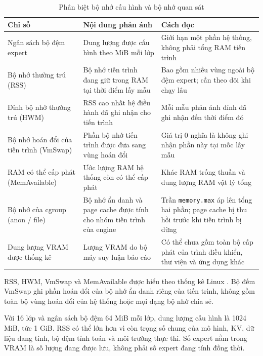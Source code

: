 \begin{table}[htbp]
\centering
\caption{Phân biệt bộ nhớ cấu hình và bộ nhớ quan sát}
\small
\setlength{\tabcolsep}{3pt}
\begin{tabularx}{\textwidth}{>{\RaggedRight\arraybackslash}p{3.5cm} >{\RaggedRight\arraybackslash}p{4cm} >{\RaggedRight\arraybackslash}X}
\toprule
\textbf{Chỉ số} & \textbf{Nội dung phản ánh} & \textbf{Cách đọc} \\
\midrule
Ngân sách bộ đệm expert & Dung lượng được cấu hình theo MiB mỗi lớp & Giới hạn một phần hệ thống, không phải tổng RAM tiến trình \\
Bộ nhớ thường trú (RSS) & Bộ nhớ tiến trình đang giữ trong RAM tại thời điểm lấy mẫu & Bao gồm nhiều vùng ngoài bộ đệm expert; cần theo dõi khi chạy lâu \\
Đỉnh bộ nhớ thường trú (HWM) & RSS cao nhất hệ điều hành đã ghi nhận cho tiến trình & Mỗi mẫu phản ánh đỉnh đã ghi nhận đến thời điểm đó \\
Bộ nhớ hoán đổi của tiến trình (VmSwap) & Phần bộ nhớ tiến trình được đưa sang vùng hoán đổi & Giá trị 0 nghĩa là không ghi nhận phần này tại mốc lấy mẫu \\
RAM có thể cấp phát (MemAvailable) & Ước lượng RAM hệ thống còn có thể cấp phát & Khác RAM trống thuần và dung lượng RAM vật lý tổng \\
Bộ nhớ của cgroup (anon / file) & Bộ nhớ ẩn danh và page cache được tính cho nhóm tiến trình của engine & Trần \texttt{memory.max} áp lên tổng hai phần; page cache bị thu hồi trước khi tiến trình bị dừng \\
Dung lượng VRAM được thống kê & Lượng VRAM do bộ máy suy luận báo cáo & Có thể chưa gồm toàn bộ cấp phát của trình điều khiển, thư viện và ứng dụng khác \\
\bottomrule
\end{tabularx}


\end{table}



RSS, HWM, VmSwap và MemAvailable được hiểu theo thống kê Linux \cite{linux_proc}. Bộ đếm VmSwap ghi phần hoán đổi của bộ nhớ ẩn danh riêng của tiến trình, không gồm toàn bộ vùng hoán đổi của hệ thống hoặc mọi dạng bộ nhớ chia sẻ.

Với 16 lớp và ngân sách bộ đệm 64 MiB mỗi lớp, dung lượng cấu hình là 1024 MiB, tức 1 GiB. RSS có thể lớn hơn vì còn trọng số chung của mô hình, KV, dữ liệu đang tính, bộ đệm tính toán và môi trường thực thi. Số expert nằm trong VRAM là số lượng đang được lưu, không phải số expert đang tính đồng thời.

